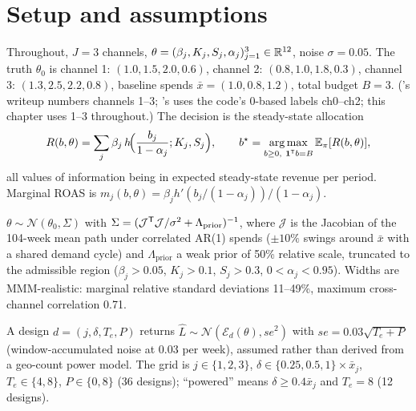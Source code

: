 \section{Setup and assumptions}

Throughout, $J = 3$ channels, $\theta = (\beta_j, K_j, S_j, \alpha_j)_{j=1}^3 \in \mathbb{R}^{12}$, noise $\sigma = 0.05$. The truth $\theta_0$ is channel 1: $(1.0, 1.5, 2.0, 0.6)$, channel 2: $(0.8, 1.0, 1.8, 0.3)$, channel 3: $(1.3, 2.5, 2.2, 0.8)$, baseline spends $\bar x = (1.0, 0.8, 1.2)$, total budget $B = 3$. ('s writeup numbers channels 1--3; 's uses the code's 0-based labels ch0--ch2; this chapter uses 1--3 throughout.) The decision is the steady-state allocation
\begin{equation}
R(b,\theta) = \sum_{j} \beta_j\, h\!\Big(\frac{b_j}{1-\alpha_j}; K_j, S_j\Big), \qquad b^\star = \operatorname*{arg\,max}_{b \ge 0,\ \mathbf{1}^{\mathsf{T}} b = B} \mathbb{E}_\pi[R(b,\theta)],
\label{voi:eq:decision}
\end{equation}
all values of information being in expected steady-state revenue per period. Marginal ROAS is $m_j(b,\theta) = \beta_j h'(b_j/(1-\alpha_j))/(1-\alpha_j)$.

\begin{assumption}
\label{voi:ass:posterior}
$\theta \sim \mathcal N(\theta_0, \Sigma)$ with $\Sigma = (\mathcal J^{\mathsf{T}}\mathcal J/\sigma^2 + \Lambda_{\mathrm{prior}})^{-1}$, where $\mathcal J$ is the Jacobian of the 104-week mean path under correlated AR(1) spends ($\pm 10\%$ swings around $\bar x$ with a shared demand cycle) and $\Lambda_{\mathrm{prior}}$ a weak prior of 50\% relative scale, truncated to the admissible region ($\beta_j > 0.05$, $K_j > 0.1$, $S_j > 0.3$, $0 < \alpha_j < 0.95$). Widths are MMM-realistic: marginal relative standard deviations 11--49\%, maximum cross-channel correlation 0.71.
\end{assumption}

\begin{assumption}
\label{voi:ass:readout}
A design $d = (j, \delta, T_e, P)$ returns $\hat L \sim \mathcal N(\mathcal E_d(\theta), se^2)$ with $se = 0.03\sqrt{T_e + P}$ (window-accumulated noise at 0.03 per week), assumed rather than derived from a geo-count power model. The grid is $j \in \{1,2,3\}$, $\delta \in \{0.25, 0.5, 1\}\times\bar x_j$, $T_e \in \{4, 8\}$, $P \in \{0, 8\}$ (36 designs); ``powered'' means $\delta \ge 0.4\bar x_j$ and $T_e = 8$ (12 designs).
\end{assumption}

